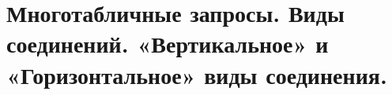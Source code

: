 {
	\section{Многотабличные запросы. Виды соединений. «Вертикальное» и «Горизонтальное» виды соединения.}
	\newpage
}
